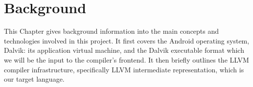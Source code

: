 \chapter{Background}
\label{chap:background}

This Chapter gives background information into the main concepts and technologies involved in this project. It first covers the Android operating system, Dalvik: its application virtual machine, and the Dalvik executable format which we will be the input to the compiler's frontend. It then briefly outlines the LLVM compiler infrastructure, specifically LLVM intermediate representation, which is our target language.








